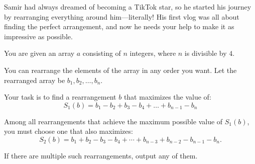 Samir had always dreamed of becoming a TikTok star, so he started his journey by rearranging everything around him---literally! His first vlog was all about finding the perfect arrangement, and now he needs your help to make it as impressive as possible.

You are given an array $a$ consisting of $n$ integers, where $n$ is divisible by $4$.

You can rearrange the elements of the array in any order you want. Let the rearranged array be $b_1, b_2, \dots, b_n$.

Your task is to find a rearrangement $b$ that maximizes the value of:
$$S_1(b) = b_1 - b_2 + b_3 - b_4 + \dots + b_{n-1} - b_n$$

Among all rearrangements that achieve the maximum possible value of $S_1(b)$, you must choose one that also maximizes:
$$S_2(b)=b_1+b_2-b_3-b_4+\cdots+b_{n-3}+b_{n-2}-b_{n-1}-b_n.$$

If there are multiple such rearrangements, output any of them.